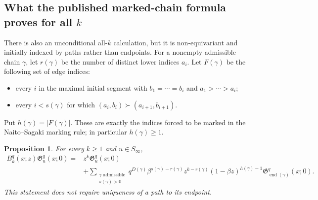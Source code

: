 \documentclass[11pt]{article}
\newtheorem{proposition}{Proposition}
\newcommand{\G}{\mathfrak{G}}
\begin{document}
\subsection{What the published marked-chain formula proves for all \texorpdfstring{$k$}{k}}

There is also an unconditional all-$k$ calculation, but it is
non-equivariant and initially indexed by paths rather than endpoints.
For a nonempty admissible chain $\gamma$, let
$r(\gamma)$ be the number of distinct lower indices $a_i$.
Let $F(\gamma)$ be the following set of edge indices:
\begin{itemize}
 \item every $i$ in the maximal initial segment with
       $b_1=\cdots=b_i$ and $a_1>\cdots>a_i$;
 \item every $i<s(\gamma)$ for which
       $(a_i,b_i)\succ(a_{i+1},b_{i+1})$.
\end{itemize}
Put $h(\gamma)=|F(\gamma)|$.
These are exactly the indices forced to be marked in the
Naito--Sagaki marking rule; in particular $h(\gamma)\geq1$.

\begin{proposition}\label{prop:marked-block}
For every $k\geq1$ and $u\in S_\infty$,
\begin{equation}\label{eq:marked-block}
\begin{split}
 B_k^q(x;z)\G_u^q(x;0)
  ={}&z^k\G_u^q(x;0)\\
   &+\sum_{\substack{\gamma\text{ admissible}\\s(\gamma)>0}}
       q^{D(\gamma)}
       \beta^{s(\gamma)-r(\gamma)}
       z^{k-r(\gamma)}
       (1-\beta z)^{h(\gamma)-1}
       \G_{\operatorname{end}(\gamma)}^q(x;0).
\end{split}
\end{equation}
This statement does not require uniqueness of a path to its endpoint.
\end{proposition}
\end{document}

